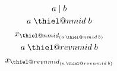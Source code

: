 \documentclass{article}
\makeatletter
\providecommand{\nmid}{}
\providecommand{\revnmid}{}
\renewcommand\nmid{\mathrel{\mathpalette\thiel@nmid\relax}}
\newcommand{\thiel@nmid}[2]{%
  \ooalign{%
    \hidewidth\rotatebox[origin=c]{40}{$\m@th#1-\mkern-3.5mu$}\hidewidth\cr
    $\m@th#1|$\cr}%
}
\renewcommand\revnmid{\mathrel{\mathpalette\thiel@revnmid\relax}}
\newcommand{\thiel@revnmid}[2]{%
  \ooalign{%
    \hidewidth\rotatebox[origin=c]{-40}{$\m@th#1-\mkern+3.5mu$}\hidewidth\cr
    $\m@th#1|$\cr}%
}
\makeatother
\begin{document}
\begin{gather*}
a\mid b\\
a\nmid b\\
x_{\nmid_{(a\,\nmid\, b)}}\\
a\revnmid b\\
x_{\revnmid_{(a\,\revnmid\, b)}}
\end{gather*}
\end{document}
